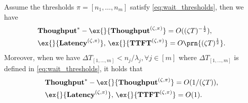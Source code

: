 \begin{theorem}
\label{thm:wait_heavy_traffic}
    Assume the thresholds $\pi=[n_1,\dots,n_m]$ satisfy \eqref{eq:wait_thresholds}, then we have 
$$
\begin{aligned}
    &\throughput^*-\ex{}{\throughput^{(\zeta,\pi)}}=O((\zeta T)^{-\frac{1}{2}}),\\ 
&\ex{}{\Latency^{(\zeta,\pi)}},\,\ex{}{\TTFT^{(\zeta,\pi)}}=O\prn{(\zeta T)^{\frac{1}{2}}}.
\end{aligned}
$$
    Moreover, when we have $\Delta T_{[1,\dots,m]}<n_j/\lambda_j,\forall j\in[m]$ where $\Delta T_{[1,\dots,m]}$ is defined in \eqref{eq:wait_thresholds}, it holds that
$$    \begin{aligned}
        &\throughput^* - \ex{}{\throughput^{(\zeta,\pi)}} = O(1/(\zeta T)), \\ 
&\ex{}{\Latency^{(\zeta,\pi)}},\, \ex{}{\TTFT^{(\zeta,\pi)}} = O(1).
    \end{aligned}$$
\end{theorem}



